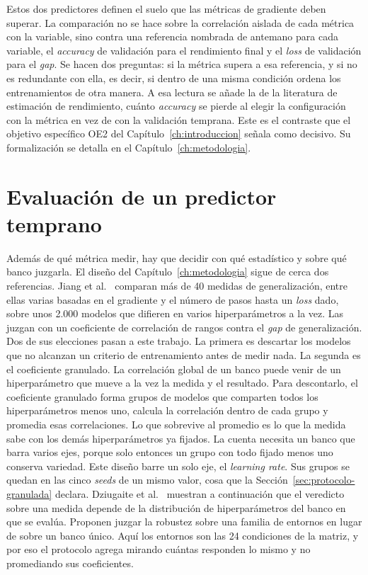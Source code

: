 Estos dos predictores definen el suelo que las métricas de gradiente deben superar. La comparación no se hace sobre la correlación aislada de cada métrica con la variable, sino contra una referencia nombrada de antemano para cada variable, el \emph{accuracy} de validación para el rendimiento final y el \emph{loss} de validación para el \emph{gap}. Se hacen dos preguntas: si la métrica supera a esa referencia, y si no es redundante con ella, es decir, si dentro de una misma condición ordena los entrenamientos de otra manera. A esa lectura se añade la de la literatura de estimación de rendimiento, cuánto \emph{accuracy} se pierde al elegir la configuración con la métrica en vez de con la validación temprana. Este es el contraste que el objetivo específico OE2 del Capítulo~\ref{ch:introduccion} señala como decisivo. Su formalización se detalla en el Capítulo~\ref{ch:metodologia}.

\section{Evaluación de un predictor temprano}
\label{sec:sota-evaluacion}

Además de qué métrica medir, hay que decidir con qué estadístico y sobre qué banco juzgarla. El diseño del Capítulo~\ref{ch:metodologia} sigue de cerca dos referencias. Jiang et al.~\cite{jiang2020fantastic} comparan más de 40 medidas de generalización, entre ellas varias basadas en el gradiente y el número de pasos hasta un \emph{loss} dado, sobre unos 2.000 modelos que difieren en varios hiperparámetros a la vez. Las juzgan con un coeficiente de correlación de rangos contra el \emph{gap} de generalización. Dos de sus elecciones pasan a este trabajo. La primera es descartar los modelos que no alcanzan un criterio de entrenamiento antes de medir nada. La segunda es el coeficiente granulado. La correlación global de un banco puede venir de un hiperparámetro que mueve a la vez la medida y el resultado. Para descontarlo, el coeficiente granulado forma grupos de modelos que comparten todos los hiperparámetros menos uno, calcula la correlación dentro de cada grupo y promedia esas correlaciones. Lo que sobrevive al promedio es lo que la medida sabe con los demás hiperparámetros ya fijados. La cuenta necesita un banco que barra varios ejes, porque solo entonces un grupo con todo fijado menos uno conserva variedad. Este diseño barre un solo eje, el \emph{learning rate}. Sus grupos se quedan en las cinco \emph{seeds} de un mismo valor, cosa que la Sección~\ref{sec:protocolo-granulada} declara. Dziugaite et al.~\cite{dziugaite2020search} muestran a continuación que el veredicto sobre una medida depende de la distribución de hiperparámetros del banco en que se evalúa. Proponen juzgar la robustez sobre una familia de entornos en lugar de sobre un banco único. Aquí los entornos son las 24 condiciones de la matriz, y por eso el protocolo agrega mirando cuántas responden lo mismo y no promediando sus coeficientes.

